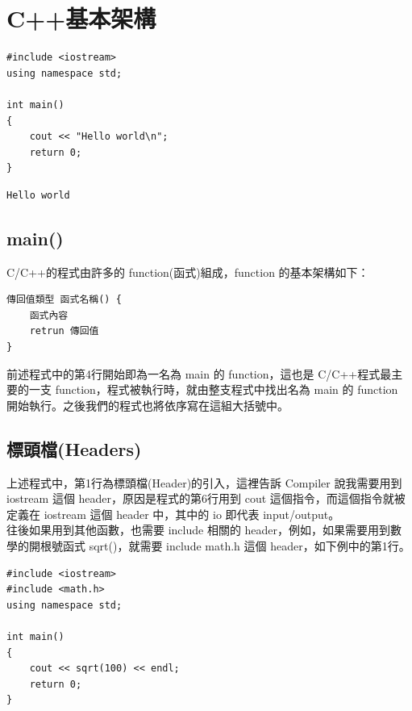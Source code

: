 \documentclass[a4paper,12pt]{article}
\begin{document}
\begin{enumerate}
\newpage
\end{enumerate}

\section{C++基本架構}
\label{cpp_arch}
\lstset{breaklines=true,language=cpp,label= ,caption= ,captionpos=b,firstnumber=1,numbers=left}
\begin{lstlisting}
#include <iostream>
using namespace std;

int main()
{
    cout << "Hello world\n";
    return 0;
}
\end{lstlisting}

\begin{verbatim}
Hello world
\end{verbatim}
\subsection{main()}
\label{sec:org5cd5337}
C/C++的程式由許多的 function(函式)組成，function 的基本架構如下：\\
\lstset{breaklines=true,language=cpp,label= ,caption= ,captionpos=b,numbers=none}
\begin{lstlisting}
傳回值類型 函式名稱() {
    函式內容
    retrun 傳回值
}
\end{lstlisting}
前述程式中的第4行開始即為一名為 main 的 function，這也是 C/C++程式最主要的一支 function，程式被執行時，就由整支程式中找出名為 main 的 function 開始執行。之後我們的程式也將依序寫在這組大括號中。\\

\subsection{標頭檔(Headers)}
\label{sec:orgb644081}
上述程式中，第1行為標頭檔(Header)的引入，這裡告訴 Compiler 說我需要用到 iostream 這個 header，原因是程式的第6行用到 cout 這個指令，而這個指令就被定義在 iostream 這個 header 中，其中的 io 即代表 input/output。\\

往後如果用到其他函數，也需要 include 相關的 header，例如，如果需要用到數學的開根號函式 sqrt()，就需要 include math.h 這個 header，如下例中的第1行。\\
\lstset{breaklines=true,language=cpp,label= ,caption= ,captionpos=b,firstnumber=1,numbers=left}
\begin{lstlisting}
#include <iostream>
#include <math.h>
using namespace std;

int main()
{
    cout << sqrt(100) << endl;
    return 0;
}

\end{lstlisting}
\end{document}
